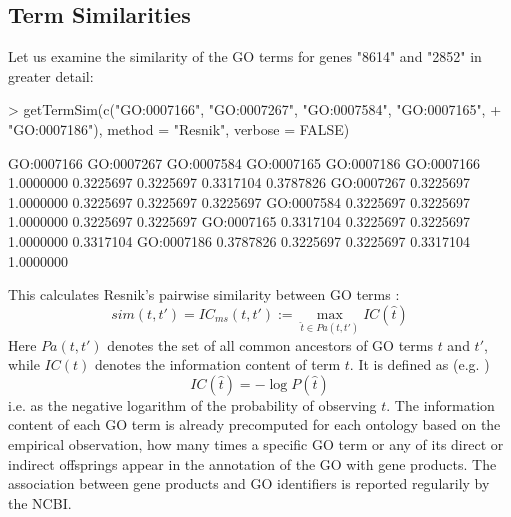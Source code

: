 \documentclass[12pt,a4paper]{article}
\begin{document}
\subsection{Term Similarities}

Let us examine the similarity of the GO terms for genes "8614" and "2852" in greater detail:
\begin{Schunk}
\begin{Sinput}
> getTermSim(c("GO:0007166", "GO:0007267", "GO:0007584", "GO:0007165", 
+     "GO:0007186"), method = "Resnik", verbose = FALSE)
\end{Sinput}
\begin{Soutput}
           GO:0007166 GO:0007267 GO:0007584 GO:0007165 GO:0007186
GO:0007166  1.0000000  0.3225697  0.3225697  0.3317104  0.3787826
GO:0007267  0.3225697  1.0000000  0.3225697  0.3225697  0.3225697
GO:0007584  0.3225697  0.3225697  1.0000000  0.3225697  0.3225697
GO:0007165  0.3317104  0.3225697  0.3225697  1.0000000  0.3317104
GO:0007186  0.3787826  0.3225697  0.3225697  0.3317104  1.0000000
\end{Soutput}
\end{Schunk}
This calculates Resnik's pairwise similarity between GO terms \cite{Resnik95,Resnik99}:
\begin{equation}
sim(t,t') = IC_{ms}(t,t') := \max_{\hat{t}\in Pa(t,t')} IC(\hat{t})\label{eq:Resnik}
\end{equation}
Here $Pa(t,t')$ denotes the set of all common ancestors of GO terms $t$ and $t'$, while $IC(t)$  denotes the information content of term $t$. It is defined as (e.g. \cite{Lord03})
\begin{equation}
IC(\hat{t}) = -\log P(\hat{t})
\end{equation}
i.e. as the negative logarithm of the probability of observing $t$. The information content of each GO term is already precomputed for each ontology based on the empirical observation, how many times a specific GO term or any of its direct or indirect offsprings appear in the annotation of the GO with gene products. The association between gene products and GO identifiers is reported regularily by the NCBI.
\end{document}
